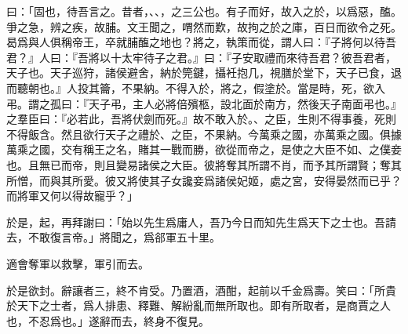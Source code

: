 曰：「固也，待吾言之。昔者，、、，之三公也。有子而好，故入之於，以爲惡，醢。爭之急，辨之疾，故脯。文王聞之，喟然而歎，故拘之於之庫，百日而欲令之死。曷爲與人俱稱帝王，卒就脯醢之地也？將之，執策而從，謂人曰：『子將何以待吾君？』人曰：『吾將以十太牢待子之君。』曰：『子安取禮而來待吾君？彼吾君者，天子也。天子巡狩，諸侯避舍，納於筦鍵，攝衽抱几，視膳於堂下，天子已食，退而聽朝也。』人投其籥，不果納。不得入於，將之，假塗於。當是時，死，欲入弔。謂之孤曰：『天子弔，主人必將倍殯柩，設北面於南方，然後天子南面弔也。』之羣臣曰：『必若此，吾將伏劍而死。』故不敢入於。、之臣，生則不得事養，死則不得飯含。然且欲行天子之禮於、之臣，不果納。今萬乘之國，亦萬乘之國。俱據萬乘之國，交有稱王之名，賭其一戰而勝，欲從而帝之，是使之大臣不如、之僕妾也。且無已而帝，則且變易諸侯之大臣。彼將奪其所謂不肖，而予其所謂賢；奪其所憎，而與其所愛。彼又將使其子女讒妾爲諸侯妃姬，處之宮，安得晏然而已乎？而將軍又何以得故寵乎？」

於是，起，再拜謝曰：「始以先生爲庸人，吾乃今日而知先生爲天下之士也。吾請去，不敢復言帝。」將聞之，爲郤軍五十里。

適會奪軍以救擊，軍引而去。

於是欲封。辭讓者三，終不肯受。乃置酒，酒酣，起前以千金爲壽。笑曰：「所貴於天下之士者，爲人排患、釋難、解紛亂而無所取也。即有所取者，是商賈之人也，不忍爲也。」遂辭而去，終身不復見。


